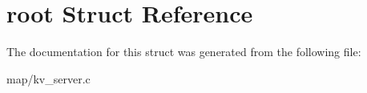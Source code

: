 \hypertarget{structroot}{}\section{root Struct Reference}
\label{structroot}


The documentation for this struct was generated from the following file\+:\begin{DoxyCompactItemize}
\item 
map/kv\+\_\+server.\+c\end{DoxyCompactItemize}
